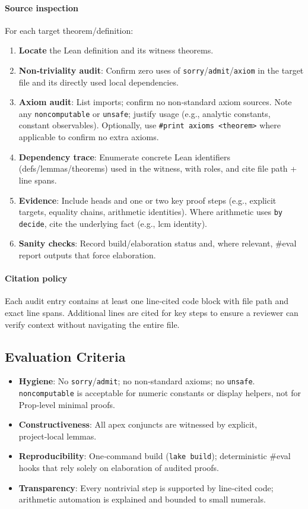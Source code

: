 \documentclass{article}
\begin{document}
\paragraph{Source inspection} For each target theorem/definition:
\begin{enumerate}[leftmargin=*]
  \item \textbf{Locate} the Lean definition and its witness theorems.
  \item \textbf{Non‑triviality audit}: Confirm zero uses of \texttt{sorry}/\texttt{admit}/\texttt{axiom} in the target file and its directly used local dependencies.
  \item \textbf{Axiom audit}: List imports; confirm no non‑standard axiom sources. Note any \texttt{noncomputable} or \texttt{unsafe}; justify usage (e.g., analytic constants, constant observables). Optionally, use \texttt{\#print axioms <theorem>} where applicable to confirm no extra axioms.
  \item \textbf{Dependency trace}: Enumerate concrete Lean identifiers (defs/lemmas/theorems) used in the witness, with roles, and cite file path + line spans.
  \item \textbf{Evidence}: Include heads and one or two key proof steps (e.g., explicit targets, equality chains, arithmetic identities). Where arithmetic uses \texttt{by decide}, cite the underlying fact (e.g., lcm identity).
  \item \textbf{Sanity checks}: Record build/elaboration status and, where relevant, #eval report outputs that force elaboration.
\end{enumerate}

\paragraph{Citation policy} Each audit entry contains at least one line‑cited code block with file path and exact line spans. Additional lines are cited for key steps to ensure a reviewer can verify context without navigating the entire file.

\subsection{Evaluation Criteria}
\begin{itemize}[leftmargin=*]
  \item \textbf{Hygiene}: No \texttt{sorry}/\texttt{admit}; no non‑standard axioms; no \texttt{unsafe}. \texttt{noncomputable} is acceptable for numeric constants or display helpers, not for Prop‑level minimal proofs.
  \item \textbf{Constructiveness}: All apex conjuncts are witnessed by explicit, project‑local lemmas.
  \item \textbf{Reproducibility}: One‑command build (\texttt{lake build}); deterministic #eval hooks that rely solely on elaboration of audited proofs.
  \item \textbf{Transparency}: Every nontrivial step is supported by line‑cited code; arithmetic automation is explained and bounded to small numerals.
\end{itemize}
\end{document}

